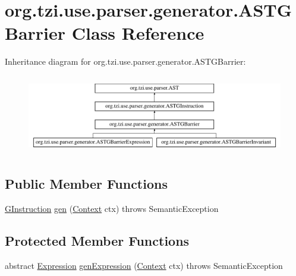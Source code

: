 \hypertarget{classorg_1_1tzi_1_1use_1_1parser_1_1generator_1_1_a_s_t_g_barrier}{\section{org.\-tzi.\-use.\-parser.\-generator.\-A\-S\-T\-G\-Barrier Class Reference}
\label{classorg_1_1tzi_1_1use_1_1parser_1_1generator_1_1_a_s_t_g_barrier}
}
Inheritance diagram for org.\-tzi.\-use.\-parser.\-generator.\-A\-S\-T\-G\-Barrier\-:\begin{figure}[H]
\begin{center}
\leavevmode
\includegraphics[height=3.522013cm]{classorg_1_1tzi_1_1use_1_1parser_1_1generator_1_1_a_s_t_g_barrier}
\end{center}
\end{figure}
\subsection*{Public Member Functions}
\begin{DoxyCompactItemize}
\item 
\hyperlink{interfaceorg_1_1tzi_1_1use_1_1gen_1_1assl_1_1statics_1_1_g_instruction}{G\-Instruction} \hyperlink{classorg_1_1tzi_1_1use_1_1parser_1_1generator_1_1_a_s_t_g_barrier_aa1329937932114100f0cfb2556be3de2}{gen} (\hyperlink{classorg_1_1tzi_1_1use_1_1parser_1_1_context}{Context} ctx)  throws Semantic\-Exception 
\end{DoxyCompactItemize}
\subsection*{Protected Member Functions}
\begin{DoxyCompactItemize}
\item 
abstract \hyperlink{classorg_1_1tzi_1_1use_1_1uml_1_1ocl_1_1expr_1_1_expression}{Expression} \hyperlink{classorg_1_1tzi_1_1use_1_1parser_1_1generator_1_1_a_s_t_g_barrier_a470481a7c411aa146c417a6ee33ec9af}{gen\-Expression} (\hyperlink{classorg_1_1tzi_1_1use_1_1parser_1_1_context}{Context} ctx)  throws Semantic\-Exception
\end{DoxyCompactItemize}


